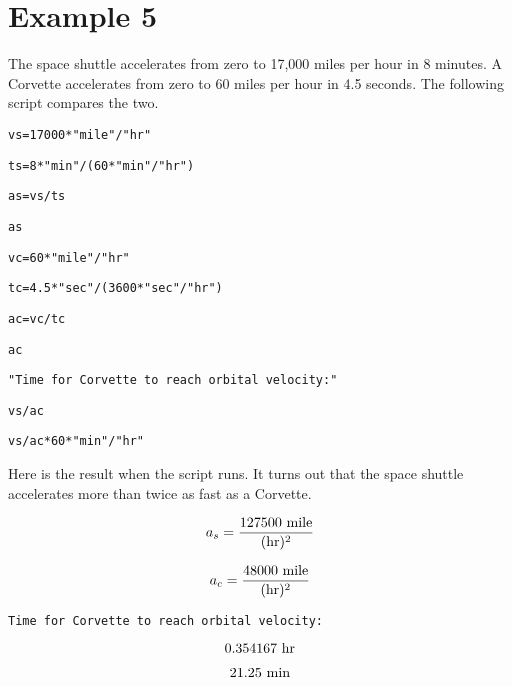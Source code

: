 
\newpage

\section*{Example 5}

The space shuttle accelerates from zero to 17{,}000 miles per hour
in 8 minutes.
A Corvette accelerates from zero to 60 miles per hour in 4.5 seconds.
The following script compares the two.

\medskip
\verb$vs=17000*"mile"/"hr"$

\verb$ts=8*"min"/(60*"min"/"hr")$

\verb$as=vs/ts$

\verb$as$

\verb$vc=60*"mile"/"hr"$

\verb$tc=4.5*"sec"/(3600*"sec"/"hr")$

\verb$ac=vc/tc$

\verb$ac$

\verb$"Time for Corvette to reach orbital velocity:"$

\verb$vs/ac$

\verb$vs/ac*60*"min"/"hr"$

\medskip
\noindent
Here is the result when the script runs.
It turns out that the space shuttle accelerates more than twice as fast as a
Corvette.

\medskip
$$a_s={\hbox{127500 mile}\over(\hbox{hr})^2}$$

$$a_c={\hbox{48000 mile}\over(\hbox{hr})^2}$$

\verb$Time for Corvette to reach orbital velocity:$

$$\hbox{0.354167 hr}$$

$$\hbox{21.25 min}$$

